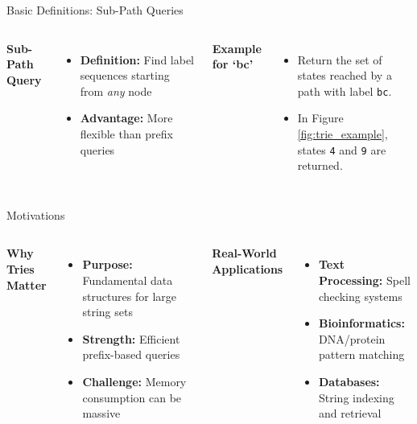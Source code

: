 \documentclass[aspectratio=169]{beamer}
\begin{document}
\begin{frame}{Basic Definitions: Sub-Path Queries}
\begin{columns}[c]
		\textcolor{oiBlue}{\textbf{Sub-Path Query}}
		\begin{itemize}
			\item \textbf{Definition:} Find label sequences starting from \textit{any} node
			\item \textbf{Advantage:} More flexible than prefix queries
		\end{itemize}
		\vspace{0.5cm}
		\textcolor{oiBlue}{\textbf{Example for `bc'}}
		\begin{itemize}
			\item Return the set of states reached by a path with label \texttt{bc}.
			\item In Figure \autoref{fig:trie_example}, states \texttt{4} and \texttt{9} are returned.
		\end{itemize}
	\end{columns}
\end{frame}

\begin{frame}{Motivations}
	\begin{columns}[t]
		\textcolor{oiVermillion}{\textbf{Why Tries Matter}}
		\begin{itemize}
			\item \textbf{Purpose:} Fundamental data structures for large string sets
			\item \textbf{Strength:} Efficient prefix-based queries
			\item \textbf{Challenge:} Memory consumption can be massive
		\end{itemize}

		\textcolor{oiBlue}{\textbf{Real-World Applications}}
		\begin{itemize}
			\item \textbf{Text Processing:} Spell checking systems
			\item \textbf{Bioinformatics:} DNA/protein pattern matching
			\item \textbf{Databases:} String indexing and retrieval
		\end{itemize}
	\end{columns}
\end{frame}
\end{document}
